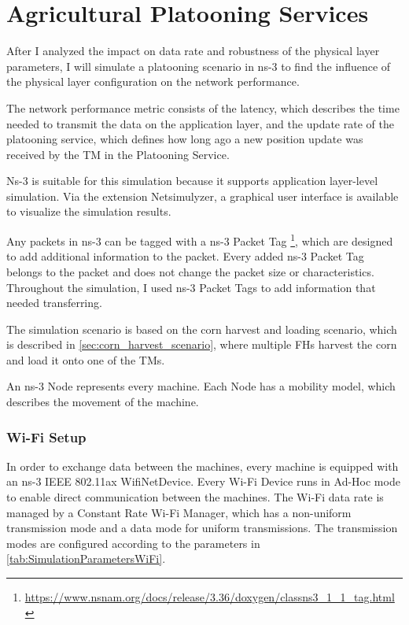 \section{Agricultural Platooning Services}

After I analyzed the impact on data rate and robustness of the physical layer parameters, I will simulate a platooning scenario in ns-3 to find the influence of the physical layer configuration on the network performance.


The network performance metric consists of the latency, which describes the time needed to transmit the data
on the application layer, and the update rate of the platooning service, which defines how long ago a new position update
was received by the \ac{TM} in the Platooning Service.

Ns-3 is suitable for this simulation because it supports application layer-level simulation.
Via the extension Netsimulyzer, a graphical user interface is available to visualize the simulation results.

Any packets in ns-3 can be tagged with a ns-3 Packet Tag \footnote{\url{https://www.nsnam.org/docs/release/3.36/doxygen/classns3_1_1_tag.html}},
which are designed to add additional information to the packet.
Every added ns-3 Packet Tag belongs to the packet and does not change the packet size or characteristics.
Throughout the simulation, I used ns-3 Packet Tags to add information that needed transferring.

The simulation scenario is based on the corn harvest and loading scenario, which is described in \autoref{sec:corn_harvest_scenario}, where
multiple \ac{FH}s harvest the corn and load it onto one of the \ac{TM}s.

An ns-3 Node represents every machine.
Each Node has a mobility model, which describes the movement of the machine.

\subsubsection*{Wi-Fi Setup}
In order to exchange data between the machines, every machine is equipped with an  ns-3 IEEE 802.11ax WifiNetDevice.
Every Wi-Fi Device runs in Ad-Hoc mode to enable direct communication
between the machines.
The Wi-Fi data rate is managed by a Constant Rate Wi-Fi Manager, which has a non-uniform
transmission mode and a data mode for uniform transmissions.
The transmission modes are configured according
to the parameters in \autoref{tab:SimulationParametersWiFi}.

